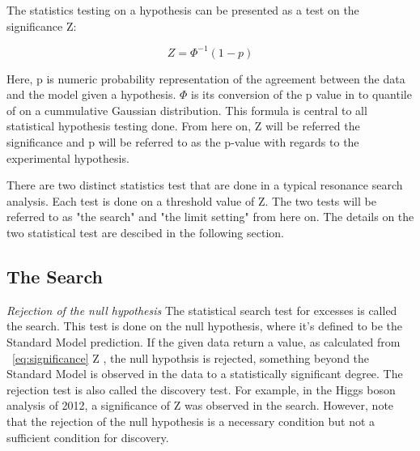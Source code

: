 The statistics testing on a hypothesis can be presented as a test on the significance Z: 

\begin{equation}
 Z= \Phi^{-1}(1-p) 
 \label{eq:significance}
\end{equation}

Here, p is numeric probability representation of the agreement between the data and the model given a hypothesis. $\Phi$ is its conversion of the p value in to quantile of on a cummulative Gaussian distribution. This formula is central to all statistical hypothesis testing done. From here on, Z will be referred the significance and p will be referred to as the p-value with regards to the experimental hypothesis. 

There are two distinct statistics test that are done in a typical resonance search analysis. Each test is done on a threshold value of Z. The two tests will be referred to as "the search" and "the limit setting" from here on. The details on the two statistical test are descibed in the following section.





\subsection{The Search}


\textit{Rejection of the null hypothesis}
The statistical search test for excesses is called the search. This test is done on the null hypothesis, where it's defined to be the Standard Model prediction. If the given data return a value, as calculated from ~\ref{eq:significance} Z , the null hypothsis is rejected, something beyond the Standard Model is observed in the data to a statistically significant degree. The rejection test is also called the discovery test. For example, in the Higgs boson analysis of 2012, a significance of Z was observed in the search. However, note that the rejection of the null hypothesis is a necessary condition but not a sufficient condition for discovery.

